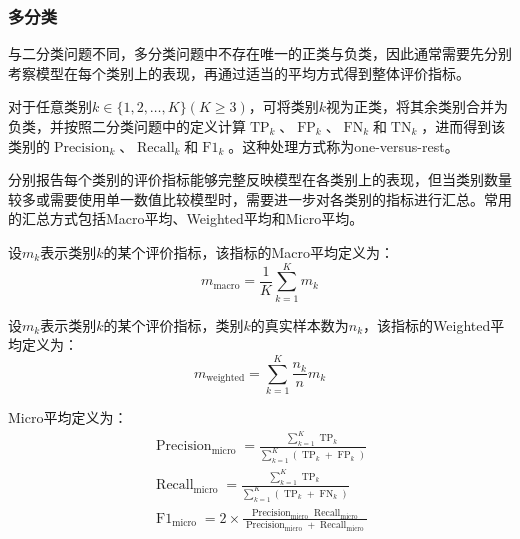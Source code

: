 \subsubsection{多分类}
与二分类问题不同，多分类问题中不存在唯一的正类与负类，因此通常需要先分别考察模型在每个类别上的表现，再通过适当的平均方式得到整体评价指标。\par
对于任意类别$k\in\{1,2,\dots,K\}(K\geqslant3)$，可将类别$k$视为正类，将其余类别合并为负类，并按照二分类问题中的定义计算$\operatorname{TP}_k$、$\operatorname{FP}_k$、$\operatorname{FN}_k$和$\operatorname{TN}_k$，进而得到该类别的$\operatorname{Precision}_k$、$\operatorname{Recall}_k$和$\operatorname{F1}_k$。这种处理方式称为one-versus-rest。\par
分别报告每个类别的评价指标能够完整反映模型在各类别上的表现，但当类别数量较多或需要使用单一数值比较模型时，需要进一步对各类别的指标进行汇总。常用的汇总方式包括Macro平均、Weighted平均和Micro平均。\par
\begin{definition}
	设$m_k$表示类别$k$的某个评价指标，该指标的Macro平均定义为：
	\begin{equation*}
		m_{\mathrm{macro}}=\frac{1}{K}\sum_{k=1}^{K}m_k
	\end{equation*}
\end{definition}
\begin{definition}
	设$m_k$表示类别$k$的某个评价指标，类别$k$的真实样本数为$n_k$，该指标的Weighted平均定义为：
	\begin{equation*}
		m_{\mathrm{weighted}}=\sum_{k=1}^{K}\frac{n_k}{n}m_k
	\end{equation*}
\end{definition}
\begin{definition}
	Micro平均定义为：
	\begin{gather*}
		\operatorname{Precision}_{\mathrm{micro}}=\frac{\sum\limits_{k=1}^{K}\operatorname{TP}_k}{\sum\limits_{k=1}^{K}(\operatorname{TP}_k+\operatorname{FP}_k)} \\
		\operatorname{Recall}_{\mathrm{micro}}=\frac{\sum\limits_{k=1}^{K}\operatorname{TP}_k}{\sum\limits_{k=1}^{K}(\operatorname{TP}_k+\operatorname{FN}_k)} \\
		\operatorname{F1}_{\mathrm{micro}}=2\times\frac{\operatorname{Precision}_{\mathrm{micro}}\operatorname{Recall}_{\mathrm{micro}}}{\operatorname{Precision}_{\mathrm{micro}}+\operatorname{Recall}_{\mathrm{micro}}}
	\end{gather*}
\end{definition}
